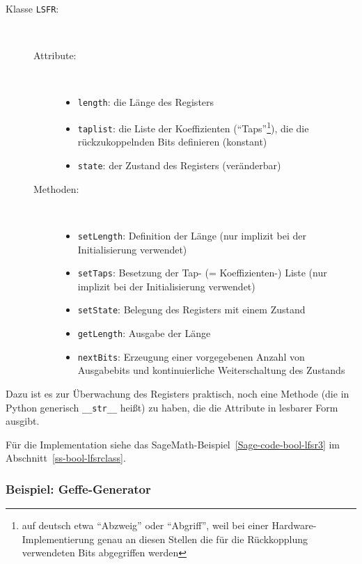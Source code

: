 \begin{refsegment}
\begin{description}
   \item[Klasse {\tt LSFR}:] ~
      \begin{description}
         \item[Attribute:] ~
            \begin{itemize}
               \item {\tt length}: die Länge des Registers
               \item {\tt taplist}: die Liste der Koeffizienten ("`Taps"'\footnote{%
                    auf deutsch etwa "`Abzweig"' oder "`Abgriff"', weil bei einer
                    Hardware-Implementierung genau an diesen Stellen die für die
                    Rückkopplung verwendeten Bits abgegriffen werden
                  }), die die  rückzukoppelnden Bits definieren (konstant)
               \item {\tt state}: der Zustand des Registers (veränderbar)
            \end{itemize}
         \item[Methoden:] ~
            \begin{itemize}
               \item {\tt setLength}: Definition der Länge (nur implizit bei
                  der Initialisierung verwendet)
               \item {\tt setTaps}: Besetzung der Tap- (= Koeffizienten-) Liste
                  (nur implizit bei der Initialisierung verwendet)
               \item {\tt setState}: Belegung des Registers mit einem Zustand
               \item {\tt getLength}: Ausgabe der Länge
               \item {\tt nextBits}: Erzeugung einer vorgegebenen Anzahl von
                  Ausgabebits und kontinuierliche Weiterschaltung des Zustands
            \end{itemize}
      \end{description}
\end{description}
Dazu ist es zur Überwachung des Registers praktisch, noch eine Methode
(die in Python generisch {\tt \_\_str\_\_} heißt) zu haben, die die
Attribute in lesbarer Form ausgibt.

Für die Implementation siehe das SageMath-Beispiel~\ref{Sage-code-bool-lfsr3}
im Abschnitt~\ref{ss-bool-lfsrclass}.

\subsubsection*{Beispiel: Geffe-Generator}


\end{refsegment}
